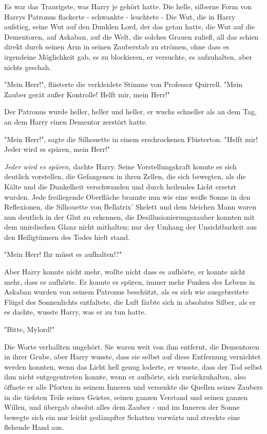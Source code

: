 {Es war das Traurigste, was Harry je gehört hatte. Die helle, silberne Form von Harrys Patronus flackerte - schwankte - leuchtete - Die Wut, die in Harry aufstieg, seine Wut auf den Dunklen Lord, der das getan hatte, die Wut auf die Dementoren, auf Askaban, auf die Welt, die solches Grauen zuließ, all das schien direkt durch seinen Arm in seinen Zauberstab zu strömen, ohne dass es irgendeine Möglichkeit gab, es zu blockieren, er versuchte, es aufzuhalten, aber nichts geschah.

"Mein Herr!", flüsterte die verkleidete Stimme von Professor Quirrell. "Mein Zauber gerät außer Kontrolle! Helft mir, mein Herr!"

Der Patronus wurde heller, heller und heller, er wuchs schneller als an dem Tag, an dem Harry einen Dementor zerstört hatte.

"Mein Herr!", sagte die Silhouette in einem erschrockenen Flüsterton. "Helft mir! Jeder wird es spüren, mein Herr!"

\emph{Jeder wird es spüren,} dachte Harry. Seine Vorstellungskraft konnte es sich deutlich vorstellen, die Gefangenen in ihren Zellen, die sich bewegten, als die Kälte und die Dunkelheit verschwanden und durch heilendes Licht ersetzt wurden. Jede freiliegende Oberfläche brannte nun wie eine weiße Sonne in den Reflexionen, die Silhouette von Bellatrix' Skelett und dem bleichen Mann waren nun deutlich in der Glut zu erkennen, die Desillusionierungszauber konnten mit dem unirdischen Glanz nicht mithalten; nur der Umhang der Unsichtbarkeit aus den Heiligtümern des Todes hielt stand.

"Mein Herr! Ihr müsst es aufhalten!?"

Aber Harry konnte nicht mehr, wollte nicht dass es aufhörte, er konnte nicht mehr, dass es aufhörte. Er konnte es spüren, immer mehr Funken des Lebens in Askaban wurden von seinem Patronus beschützt, als es sich wie ausgebreitete Flügel des Sonnenlichts entfaltete, die Luft färbte sich in absolutes Silber, als er es dachte, wusste Harry, was er zu tun hatte.

"Bitte, Mylord!"

Die Worte verhallten ungehört. Sie waren weit von ihm entfernt, die Dementoren in ihrer Grube, aber Harry wusste, dass sie selbst auf diese Entfernung vernichtet werden konnten, wenn das Licht hell genug loderte, er wusste, dass der Tod selbst ihm nicht entgegentreten konnte, wenn er aufhörte, sich zurückzuhalten, also öffnete er alle Pforten in seinem Inneren und versenkte die Quellen seines Zaubers in die tiefsten Teile seines Geistes, seinen ganzen Verstand und seinen ganzen Willen, und übergab absolut alles dem Zauber - und im Inneren der Sonne bewegte sich ein nur leicht gedämpfter Schatten vorwärts und streckte eine flehende Hand aus.

}
